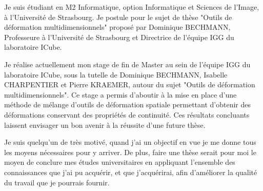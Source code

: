 \documentclass[11pt,a4paper,sans]{moderncv}        %
\begin{document}
Je suis étudiant en M2 Informatique, option Informatique et Sciences de l'Image, à l'Université de Strasbourg. Je postule pour le sujet de thèse "Outils de déformation multidimensionnels" proposé par Dominique BECHMANN, Professeure à l'Université de Strasbourg et Directrice de l'équipe IGG du laboratoire ICube.

Je réalise actuellement mon stage de fin de Master au sein de l'équipe IGG du laboratoire ICube, sous la tutelle de Dominique BECHMANN, Isabelle CHARPENTIER et Pierre KRAEMER, autour du sujet "Outils de déformation multidimensionnels". Ce stage a permis d'aboutir à la mise en place d'une méthode de mélange d'outils de déformation spatiale permettant d'obtenir des déformations conservant des propriétés de continuité. Ces résultats concluants laissent envisager un bon avenir à la réussite d'une future thèse.

Je suis quelqu'un de très motivé, quand j'ai un objectif en vue je me donne tous les moyens nécessaires pour y arriver. De plus, faire une thèse serait pour moi le moyen de conclure mes études universitaires en appliquant l'ensemble des connaissances que j'ai pu acquérir, et que j'acquérirai, afin d'améliorer la qualité du travail que je pourrais fournir.

\makeletterclosing

\end{document}
